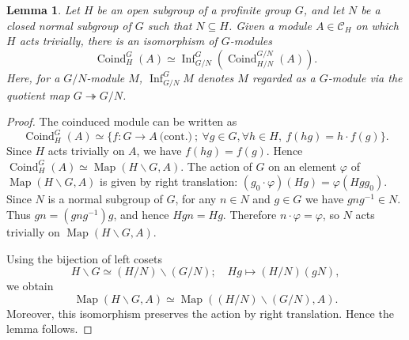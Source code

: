\documentclass{article}
\numberwithin{equation}{section} %
\newtheorem{lemm}{Lemma}[section]
\begin{document}
        
            
        \begin{lemm}
            \label{rejtgiownmgtiom}
            Let $H$ be an open subgroup of a profinite group $G$, and let $N$ be a closed normal subgroup of $G$ such that $N \subseteq H$. Given a module $A \in \mathscr{C}_H$ on which $H$ acts trivially, there is an isomorphism of $G$-modules
            \[
              \operatorname{Coind}_H^G(A)
              \simeq
              \operatorname{Inf}^G_{G/N}\left(\operatorname{Coind}_{H/N}^{G/N}(A)\right).
            \]
            Here, for a $G/N$-module $M$, $\operatorname{Inf}_{G/N}^G M$ denotes $M$ regarded as a $G$-module via the quotient map $G \twoheadrightarrow G/N$.
        \end{lemm}

        \begin{proof}
            The coinduced module can be written as
            \[
              \operatorname{Coind}_H^G(A)
              \simeq
              \{f: G \to A \ \text{(cont.)} \ ; \ \forall g \in G, \forall h \in H, \ f(hg) = h\cdot f(g)\}.
            \]
            Since $H$ acts trivially on $A$, we have $f(hg)=f(g)$. Hence $\operatorname{Coind}_H^G(A) \simeq \operatorname{Map}(H\backslash G,A)$. The action of $G$ on an element $\varphi$ of $\operatorname{Map}(H\backslash G,A)$ is given by right translation: $(g_0\cdot \varphi)(Hg) = \varphi(Hgg_0)$. Since $N$ is a normal subgroup of $G$, for any $n\in N$ and $g\in G$ we have $gng^{-1}\in N$. Thus $gn = (gng^{-1})g$, and hence $Hgn = Hg$.
            Therefore $n\cdot \varphi=\varphi$, so $N$ acts trivially on $\operatorname{Map}(H\backslash G,A)$.

            Using the bijection of left cosets
            \[
              H \backslash G
              \simeq
              (H/N)\backslash (G/N);
              \quad
              Hg \mapsto (H/N)(gN),
            \]
            we obtain
            \[
              \operatorname{Map}(H\backslash G,A)
              \simeq
              \operatorname{Map}((H/N)\backslash (G/N),A).
            \]
            Moreover, this isomorphism preserves the action by right translation. Hence the lemma follows.
        \end{proof}
\end{document}
